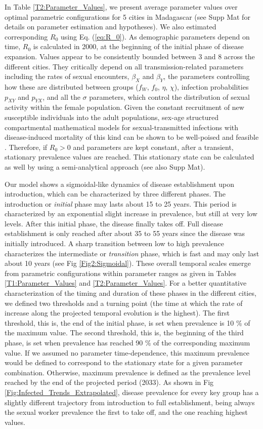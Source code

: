 \documentclass[preprint,12pt]{elsarticle}
\begin{document}
In Table \ref{T2:Parameter_Values}, we present average parameter values over optimal parametric configurations for 5 cities in Madagascar (see Supp Mat for details on parameter estimation and hypotheses). We also estimated corresponding $R_0$ using Eq. (\ref{eq:R_0}).  As demographic parameters depend on time, $R_0$ is calculated in 2000, at the beginning of the initial phase of disease expansion. Values appear to be consistently bounded between 3 and 8 across the different cities. They critically depend on all transmission-related parameters including the rates of sexual encounters, $\beta_X$ and $\beta_Y$, the parameters controlling how these are distributed between groups ($f_W$, $f_0$, $\eta$, $\chi$), infection probabilities $p_{XY}$ and $p_{YX}$, and all the $\sigma$ parameters, which control the distribution of sexual activity within the female population. Given the constant recruitment of new susceptible individuals into the adult populations, sex-age structured compartmental mathematical models for sexual-transmitted infections with disease-induced mortality of this kind can be shown to be well-poised and feasible \cite{Omondi2019}. Therefore, if $R_0 > 0$ and parameters are kept constant, after a transient, stationary prevalence values are reached. This stationary state can be calculated as well by using a semi-analytical approach \cite{Alonso2019} (see also Supp Mat). 
\smallskip

Our model shows a sigmoidal-like dynamics of disease establishment upon introduction, which can be characterized by three different phases. The introduction or {\em initial} phase may lasts about 15 to 25 years. This period is characterized by an exponential slight increase in prevalence, but still at very low levels. After this initial phase, the disease finally takes off. Full disease establishment is only reached after about 35 to 55 years since the disease was initially introduced. A sharp transition between low to high prevalence characterizes the intermediate or {\em transition} phase, which is fast and may only last about 10 years (see Fig \ref{Fig2:Sigmoidal}). These overall temporal scales emerge from parametric configurations within parameter ranges as given in Tables \ref{T1:Parameter_Values} and \ref{T2:Parameter_Values}. For a better quantitative characterization of the timing and duration of these phases in the different cities, we defined two thresholds and a turning point (the time at which the rate of increase along the projected temporal evolution is the highest). The first threshold, this is, the end of the initial phase, is set when prevalence is 10 \% of the maximum value. The second threshold, this is, the beginning of the third phase, is set when prevalence has reached 90 \% of the corresponding maximum value. If we assumed no parameter time-dependence, this maximum prevalence would be defined to correspond to the stationary state for a given parameter combination. Otherwise, maximum prevalence is defined as the prevalence level reached by the end of the projected period (2033). As shown in Fig \ref{Fig:Infected_Trends_Extrapolated}, disease prevalence for every key group has a slightly different trajectory from introduction to full establishment, being always the sexual worker prevalence the first to take off, and the one reaching highest values. 
\end{document}
